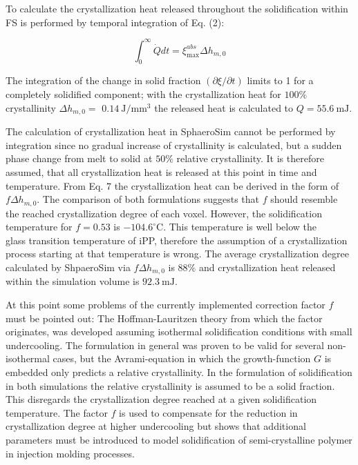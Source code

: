 \documentclass[10pt]{article}
\begin{document}
To calculate the crystallization heat released throughout the solidification within FS is performed by temporal integration of Eq. (2):


\begin{equation*}
\int_{0}^{\infty} \dot{Q} d t=\xi_{\max }^{a b s} \Delta h_{m, 0} \tag{9}
\end{equation*}


The integration of the change in solid fraction $(\partial \xi / \partial t)$ limits to 1 for a completely solidified component; with the crystallization heat for $100 \%$ crystallinity $\Delta h_{m, 0}=$ $0.14 \mathrm{~J} / \mathrm{mm}^{3}$ the released heat is calculated to $Q=55.6 \mathrm{~mJ}$.

The calculation of crystallization heat in SphaeroSim cannot be performed by integration since no gradual increase of crystallinity is calculated, but a sudden phase change from melt to solid at $50 \%$ relative crystallinity. It is therefore assumed, that all crystallization heat is released at this point in time and temperature. From Eq. 7 the crystallization heat can be derived in the form of $f \Delta h_{m, 0}$. The comparison of both formulations suggests that $f$ should resemble the reached crystallization degree of each voxel. However, the solidification temperature for $f=0.53$ is $-104.6^{\circ} \mathrm{C}$. This temperature is well below the\\
glass transition temperature of iPP, therefore the assumption of a crystallization process starting at that temperature is wrong. The average crystallization degree calculated by ShpaeroSim via $f \Delta h_{m, 0}$ is $88 \%$ and crystallization heat released within the simulation volume is $92.3 \mathrm{~mJ}$.

At this point some problems of the currently implemented correction factor $f$ must be pointed out: The Hoffman-Lauritzen theory from which the factor originates, was developed assuming isothermal solidification conditions with small undercooling. The formulation in general was proven to be valid for several non-isothermal cases, but the Avrami-equation in which the growth-function $G$ is embedded only predicts a relative crystallinity. In the formulation of solidification in both simulations the relative crystallinity is assumed to be a solid fraction. This disregards the crystallization degree reached at a given solidification temperature. The factor $f$ is used to compensate for the reduction in crystallization degree at higher undercooling but shows that additional parameters must be introduced to model solidification of semi-crystalline polymer in injection molding processes.
\end{document}
